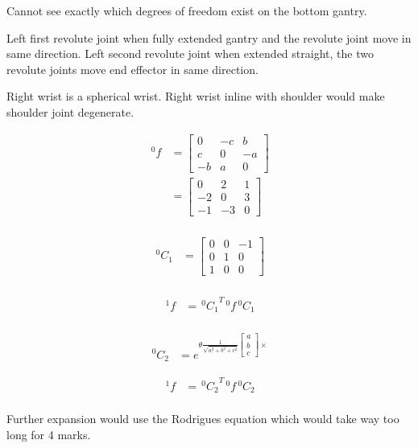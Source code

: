 \begin{solutionbox}[Q1-1]
    Cannot see exactly which degrees of freedom exist on the bottom gantry.

    Left first revolute joint when fully extended gantry and the revolute joint move in same direction.
    Left second revolute joint when extended straight, the two revolute joints move end effector in same direction.

    Right wrist is a spherical wrist.
    Right wrist inline with shoulder would make shoulder joint degenerate.
\end{solutionbox}

\begin{solutionbox}[Q1-2-i]
    \begin{align*}
        {\,^0f} & =
        \begin{bmatrix}
            0  & -c & b  \\
            c  & 0  & -a \\
            -b & a  & 0
        \end{bmatrix} \\
                & =
        \begin{bmatrix}
            0  & 2  & 1 \\
            -2 & 0  & 3 \\
            -1 & -3 & 0
        \end{bmatrix} \\
    \end{align*}

    \begin{align*}
        {\,^0C_1} & =
        \begin{bmatrix}
            0 & 0 & -1 \\
            0 & 1 & 0  \\
            1 & 0 & 0
        \end{bmatrix} \\
    \end{align*}

    \begin{align*}
        {\,^1f} & = {\,^0C_1}^T{\,^0f}{\,^0C_1} \\
    \end{align*}

\end{solutionbox}

\begin{solutionbox}[Q1-2-ii]
    \begin{align*}
        {\,^0C_2} & =e^{\theta \frac{1}{\sqrt{a^2 + b^2 + c^2}}\begin{bmatrix}a \\ b \\c\end{bmatrix}\times}
    \end{align*}

    \begin{align*}
        {\,^1f} & = {\,^0C_2}^T{\,^0f}{\,^0C_2} \\
    \end{align*}

    Further expansion would use the Rodrigues equation which would take way too long for 4 marks.
\end{solutionbox}

